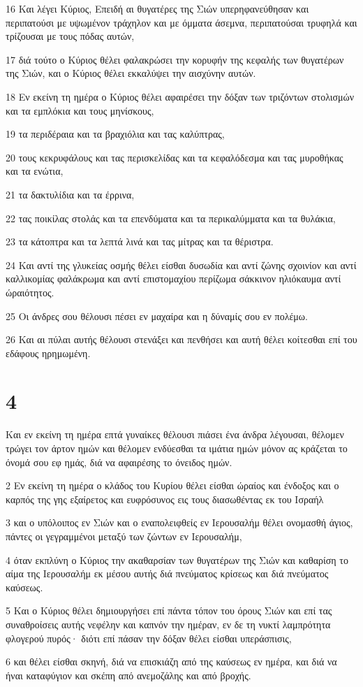 \par 16 Και λέγει Κύριος, Επειδή αι θυγατέρες της Σιών υπερηφανεύθησαν και περιπατούσι με υψωμένον τράχηλον και με όμματα άσεμνα, περιπατούσαι τρυφηλά και τρίζουσαι με τους πόδας αυτών,
\par 17 διά τούτο ο Κύριος θέλει φαλακρώσει την κορυφήν της κεφαλής των θυγατέρων της Σιών, και ο Κύριος θέλει εκκαλύψει την αισχύνην αυτών.
\par 18 Εν εκείνη τη ημέρα ο Κύριος θέλει αφαιρέσει την δόξαν των τριζόντων στολισμών και τα εμπλόκια και τους μηνίσκους,
\par 19 τα περιδέραια και τα βραχιόλια και τας καλύπτρας,
\par 20 τους κεκρυφάλους και τας περισκελίδας και τα κεφαλόδεσμα και τας μυροθήκας και τα ενώτια,
\par 21 τα δακτυλίδια και τα έρρινα,
\par 22 τας ποικίλας στολάς και τα επενδύματα και τα περικαλύμματα και τα θυλάκια,
\par 23 τα κάτοπτρα και τα λεπτά λινά και τας μίτρας και τα θέριστρα.
\par 24 Και αντί της γλυκείας οσμής θέλει είσθαι δυσωδία και αντί ζώνης σχοινίον και αντί καλλικομίας φαλάκρωμα και αντί επιστομαχίου περίζωμα σάκκινον ηλιόκαυμα αντί ώραιότητος.
\par 25 Οι άνδρες σου θέλουσι πέσει εν μαχαίρα και η δύναμίς σου εν πολέμω.
\par 26 Και αι πύλαι αυτής θέλουσι στενάξει και πενθήσει και αυτή θέλει κοίτεσθαι επί του εδάφους ηρημωμένη.

\chapter{4}

\par Και εν εκείνη τη ημέρα επτά γυναίκες θέλουσι πιάσει ένα άνδρα λέγουσαι, θέλομεν τρώγει τον άρτον ημών και θέλομεν ενδύεσθαι τα ιμάτια ημών μόνον ας κράζεται το όνομά σου εφ ημάς, διά να αφαιρέσης το όνειδος ημών.
\par 2 Εν εκείνη τη ημέρα ο κλάδος του Κυρίου θέλει είσθαι ώραίος και ένδοξος και ο καρπός της γης εξαίρετος και ευφρόσυνος εις τους διασωθέντας εκ του Ισραήλ
\par 3 και ο υπόλοιπος εν Σιών και ο εναπολειφθείς εν Ιερουσαλήμ θέλει ονομασθή άγιος, πάντες οι γεγραμμένοι μεταξύ των ζώντων εν Ιερουσαλήμ,
\par 4 όταν εκπλύνη ο Κύριος την ακαθαρσίαν των θυγατέρων της Σιών και καθαρίση το αίμα της Ιερουσαλήμ εκ μέσου αυτής διά πνεύματος κρίσεως και διά πνεύματος καύσεως.
\par 5 Και ο Κύριος θέλει δημιουργήσει επί πάντα τόπον του όρους Σιών και επί τας συναθροίσεις αυτής νεφέλην και καπνόν την ημέραν, εν δε τη νυκτί λαμπρότητα φλογερού πυρός· διότι επί πάσαν την δόξαν θέλει είσθαι υπεράσπισις,
\par 6 και θέλει είσθαι σκηνή, διά να επισκιάζη από της καύσεως εν ημέρα, και διά να ήναι καταφύγιον και σκέπη από ανεμοζάλης και από βροχής.

